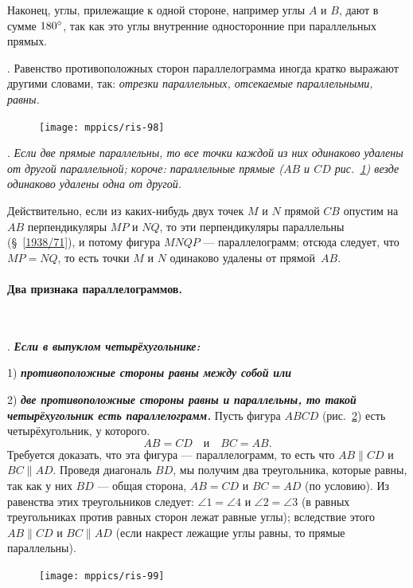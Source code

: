 \documentclass[twoside]{book}
\begin{document}
Наконец, углы, прилежащие к одной стороне, например углы $A$ и $B$, дают в сумме $180\degree$, так как это углы внутренние односторонние при параллельных прямых.

\smallskip
{}.
Равенство противоположных сторон параллелограмма иногда кратко выражают другими словами, так:
\emph{отрезки параллельных, отсекаемые параллельными, равны.}

\begin{figure}
\centering
\vskip-2mm
\texttt{[image: mppics/ris-98]}
\caption{}\label{1938/ris-98}
\end{figure}

\smallskip
\mbox{.}
\emph{Если две прямые параллельны, то все точки каждой из них одинаково удалены от другой параллельной;
короче:
параллельные прямые \emph{($AB$ и $CD$ рис.~\ref{1938/ris-98})} везде одинаково удалены одна от другой.}

Действительно, если из каких-нибудь двух точек $M$ и $N$ прямой $CB$ опустим на $AB$ перпендикуляры $MP$ и $NQ$, то эти перпендикуляры параллельны (§~\ref{1938/71}), и потому фигура $MNQP$ — параллелограмм;
отсюда следует, что $MP=NQ$, то есть точки $M$ и $N$ одинаково удалены от прямой~$AB$.

\paragraph{Два признака параллелограммов.}\label{1938/89}\ 

\smallskip
\mbox{.}
\textbf{\emph{Если в выпуклом четырёхугольнике:}}

1) \textbf{\emph{противоположные стороны равны между собой или}}

2) \textbf{\emph{две противоположные стороны равны и параллельны, то такой четырёхугольник есть параллелограмм.}}
Пусть фигура $ABCD$ (рис.~\ref{1938/ris-99}) есть четырёхугольник, у которого.
\[AB=CD\quad \text{и}\quad BC=AB.\]
Требуется доказать, что эта фигура — параллелограмм, то есть что $AB\parallel CD$ и $BC \parallel AD$.
Проведя диагональ $BD$, мы получим два треугольника, которые равны, так как у них $BD$ — общая сторона, $AB=CD$ и $BC = AD$ (по условию).
Из равенства этих треугольников следует:
$\angle 1 = \angle 4 $ и $\angle 2 = \angle 3$ (в равных треугольниках против равных сторон лежат равные углы);
вследствие этого $AB \parallel CD$ и $BC\parallel AD$ (если накрест лежащие углы равны, то прямые параллельны).

\begin{figure}
\centering
\texttt{[image: mppics/ris-99]}
\caption{}\label{1938/ris-99}
\end{figure}
\end{document}
